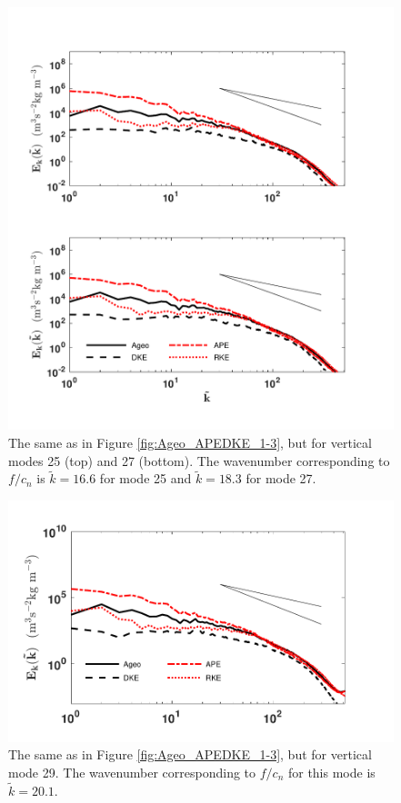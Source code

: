 \begin{figure}[H]
\includegraphics[scale=1]{Chapter4/img/Ageo_APEDKE_25-27}
\caption{The same as in Figure \ref{fig:Ageo_APEDKE_1-3}, but for vertical modes 25 (top) and 27 (bottom). The wavenumber corresponding to $f/c_n$ is $\tilde{k} = 16.6$ for mode 25 and $\tilde{k} = 18.3$ for mode 27.}
\label{fig:Ageo_APEDKE_25-27}
\end{figure}

\begin{figure}[H]
\includegraphics[scale=1]{Chapter4/img/Ageo_APEDKE_29}
\caption{The same as in Figure \ref{fig:Ageo_APEDKE_1-3}, but for vertical mode 29. The wavenumber corresponding to $f/c_n$ for this mode is $\tilde{k} = 20.1$.}
\label{fig:Ageo_APEDKE_29}
\end{figure}

